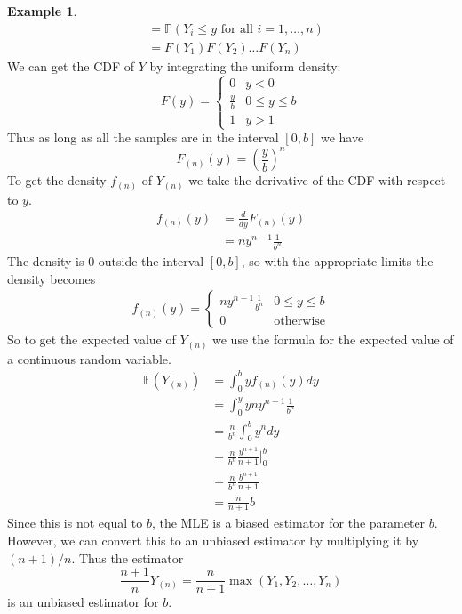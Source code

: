 \documentclass[12pt]{article}
\theoremstyle{definition}
\newtheorem*{example}{Example}
\theoremstyle{remark}
\def\P{{\mathbb P}}
\def\E{{\mathbb E}}
\begin{document}
\begin{example}
\begin{align*}
&= \P(Y_i \leq y \text{ for all $i = 1, \dots, n$}) \\
&= F(Y_1)F(Y_2)\dots F(Y_n)
\end{align*}
We can get the CDF of $Y$ by integrating the uniform density:
\[
F(y) = \begin{cases}
0 & y < 0 \\
\frac{y}{b} & 0 \leq y \leq b \\
1 & y > 1
\end{cases}
\]
Thus as long as all the samples are in the interval $[0, b]$ we have
\[ 
F_{(n)}(y) = \left( \frac{y}{b} \right)^n
\]
To get the density $f_{(n)}$ of $Y_{(n)}$ we take the derivative of the CDF with respect to $y$.
\begin{align*}
f_{(n)}(y) &= \frac{d}{dy}F_{(n)}(y) \\
&= n y^{n-1} \frac{1}{b^n}
\end{align*}
The density is 0 outside the interval $[0, b]$, so with the appropriate limits the density becomes
\begin{align*}
f_{(n)}(y) = \begin{cases}
n y^{n-1} \frac{1}{b^n} & 0 \leq y \leq b \\
0 & \text{otherwise}
\end{cases}
\end{align*}
So to get the expected value of $Y_{(n)}$ we use the formula for the expected value of a continuous random variable.
\begin{align*}
\E( Y_{(n)} ) &= \int_0^b y f_{(n)}(y) dy\\
&= \int_0^y y n y^{n-1} \frac{1}{b^n} \\
&= \frac{n}{b^n} \int_0^b y^n dy \\
&= \frac{n}{b^n} \frac{y^{n+1}}{n+1}\Bigr|_0^b \\
&= \frac{n}{b^n} \frac{b^{n+1}}{n+1} \\
&= \frac{n}{n+1} b 
\end{align*}
Since this is not equal to $b$, the MLE is a biased estimator for the parameter $b$. However, we can convert this to an unbiased estimator by multiplying it by $(n+1)/n$. Thus the estimator
\[
\frac{n+1}{n}Y_{(n)} = \frac{n}{n+1} \max(Y_1, Y_2, \dots, Y_n)
\]
is an unbiased estimator for $b$.

\end{example}
\end{document}
